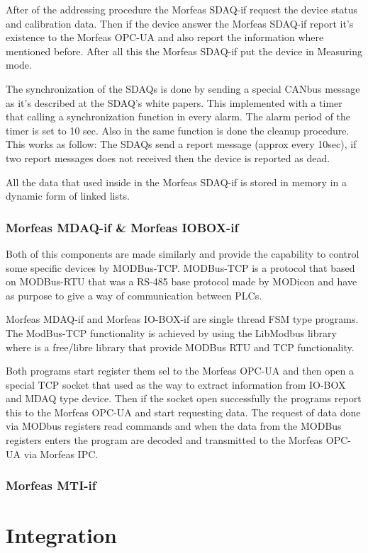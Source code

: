 \documentclass{article}
\begin{document}
After of the addressing procedure the Morfeas SDAQ-if request the device status and calibration data. Then if the device answer the Morfeas SDAQ-if report it's existence to the Morfeas OPC-UA
and also report the information where mentioned before. After all this the Morfeas SDAQ-if put the device in Measuring mode.

The synchronization of the SDAQs is done by sending a special CANbus message as it's described at the SDAQ's white papers. This implemented with a timer that calling a synchronization function in every alarm.
The alarm period of the timer is set to 10 sec. Also in the same function is done the cleanup procedure.
This works as follow: The SDAQs send a report message (approx every 10sec), if two report messages does not received then the device is reported as dead.

All the data that used inside in the Morfeas SDAQ-if is stored in memory in a dynamic form of linked lists.
\subsubsection{Morfeas MDAQ-if \& Morfeas IOBOX-if}
Both of this components are made similarly and provide the capability to control some specific devices by MODBus-TCP. MODBus-TCP is a protocol that based on MODBus-RTU that was a RS-485 base protocol made by MODicon and have
as purpose to give a way of communication between PLCs.

Morfeas MDAQ-if and Morfeas IO-BOX-if are single thread FSM type programs. The ModBus-TCP functionality is achieved by using the LibModbus library where is a free/libre library that provide MODBus RTU and TCP functionality.

Both programs start register them sel to the Morfeas OPC-UA and then open a special TCP socket that used as the way to extract information from IO-BOX and MDAQ type device. Then if the socket open successfully the programs report this to the Morfeas OPC-UA
and start requesting data. The request of data done via MODbus registers read commands and when the data from the MODBus registers enters the program are decoded and transmitted to the Morfeas OPC-UA via Morfeas IPC.
\subsubsection{Morfeas MTI-if}

\section{Integration}
\newpage
\end{document}
